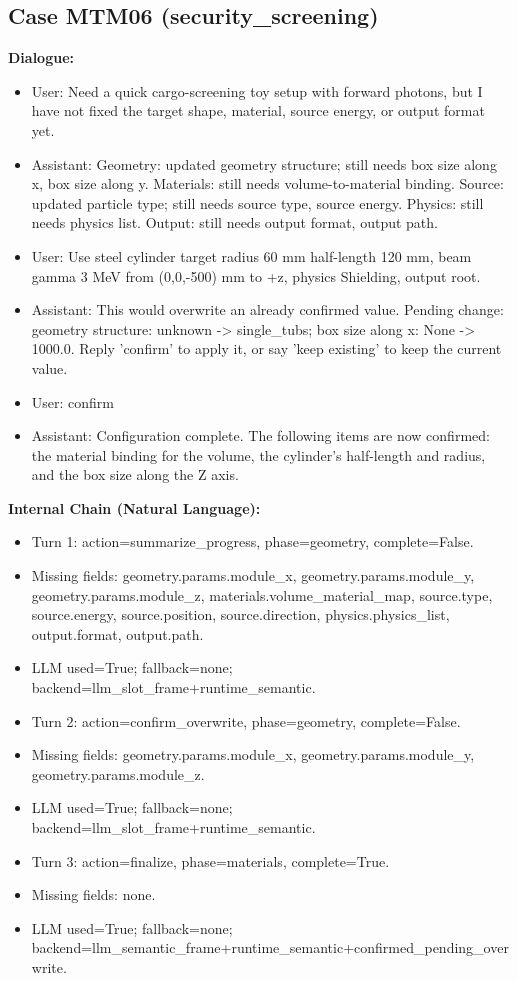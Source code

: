 \documentclass[11pt]{ctexart}
\begin{document}
\subsection{Case MTM06 (security\_screening)}
\textbf{Dialogue:}
\begin{itemize}
\item User: Need a quick cargo-screening toy setup with forward photons, but I have not fixed the target shape, material, source energy, or output format yet.
\item Assistant: Geometry: updated geometry structure; still needs box size along x, box size along y. Materials: still needs volume-to-material binding. Source: updated particle type; still needs source type, source energy. Physics: still needs physics list. Output: still needs output format, output path.
\item User: Use steel cylinder target radius 60 mm half-length 120 mm, beam gamma 3 MeV from (0,0,-500) mm to +z, physics Shielding, output root.
\item Assistant: This would overwrite an already confirmed value. Pending change: geometry structure: unknown -> single\_tubs; box size along x: None -> 1000.0. Reply 'confirm' to apply it, or say 'keep existing' to keep the current value.
\item User: confirm
\item Assistant: Configuration complete. The following items are now confirmed: the material binding for the volume, the cylinder's half-length and radius, and the box size along the Z axis.
\end{itemize}
\textbf{Internal Chain (Natural Language):}
\begin{itemize}
\item Turn 1: action=summarize\_progress, phase=geometry, complete=False.
\item Missing fields: geometry.params.module\_x, geometry.params.module\_y, geometry.params.module\_z, materials.volume\_material\_map, source.type, source.energy, source.position, source.direction, physics.physics\_list, output.format, output.path.
\item LLM used=True; fallback=none; backend=llm\_slot\_frame+runtime\_semantic.
\item Turn 2: action=confirm\_overwrite, phase=geometry, complete=False.
\item Missing fields: geometry.params.module\_x, geometry.params.module\_y, geometry.params.module\_z.
\item LLM used=True; fallback=none; backend=llm\_slot\_frame+runtime\_semantic.
\item Turn 3: action=finalize, phase=materials, complete=True.
\item Missing fields: none.
\item LLM used=True; fallback=none; backend=llm\_semantic\_frame+runtime\_semantic+confirmed\_pending\_overwrite.
\end{itemize}
\end{document}
